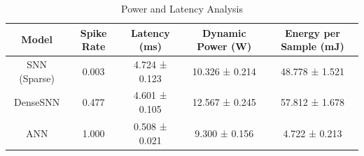 \begin{table}[!t]
\centering
\caption{Power and Latency Analysis}
\label{tab:power}
\begin{tabular}{c c c c c}
\toprule
Model & Spike Rate & Latency (ms) & Dynamic Power (W) & Energy per Sample (mJ) \\
\midrule
SNN (Sparse) & 0.003 & 4.724 ± 0.123 & 10.326 ± 0.214 & 48.778 ± 1.521 \\
DenseSNN & 0.477 & 4.601 ± 0.105 & 12.567 ± 0.245 & 57.812 ± 1.678 \\
ANN & 1.000 & 0.508 ± 0.021 & 9.300 ± 0.156 & 4.722 ± 0.213 \\
\bottomrule
\end{tabular}
\end{table}